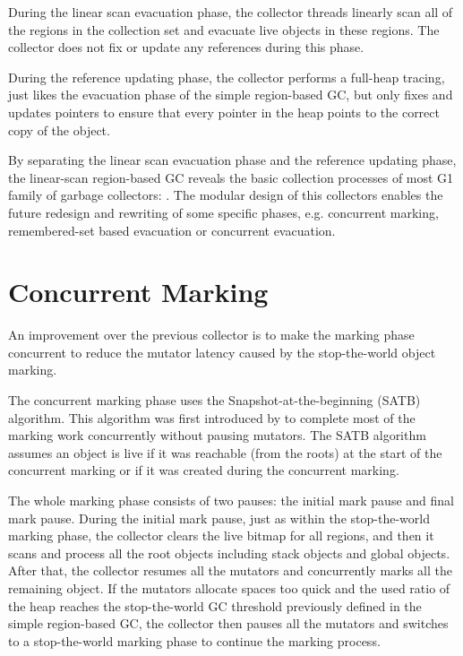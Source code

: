 During the linear scan evacuation phase, the collector threads linearly scan all of the regions
in the collection set and evacuate live objects in these regions. The collector does not
fix or update any references during this phase.

During the reference updating phase, the collector performs a full-heap tracing,
just likes the evacuation phase of the simple region-based GC, but only fixes and updates
pointers to ensure that every pointer in the heap points to the correct copy of the object.

By separating the linear scan evacuation phase and the reference updating phase,
the linear-scan region-based GC reveals the basic collection processes of most G1 family
of garbage collectors: .
The modular design of this collectors enables the future redesign and rewriting of some specific
phases, e.g. concurrent marking, remembered-set based evacuation or concurrent evacuation.

\section{Concurrent Marking}
\label{sec:concmarkgc}

An improvement over the previous collector is to make the marking phase concurrent to reduce the
mutator latency caused by the stop-the-world object marking.

The concurrent marking phase uses the Snapshot-at-the-beginning (SATB) algorithm.
This algorithm was first introduced by \cite{yuasa1990real} to
complete most of the marking work concurrently without pausing mutators.
The SATB algorithm assumes an object is live if it was reachable (from the roots)
at the start of the concurrent marking or if it was created during the concurrent marking.

The whole marking phase consists of two pauses: the initial mark pause and final mark pause.
During the initial mark pause, just as within the stop-the-world marking phase,
the collector clears the live bitmap for all regions,
and then it scans and process all the root objects including stack objects and global objects.
After that, the collector resumes all the mutators and concurrently marks all the remaining object.
If the mutators allocate spaces too quick and the used ratio of the heap reaches
the stop-the-world GC threshold previously defined in the simple region-based GC, the
collector then pauses all the mutators and switches to a stop-the-world marking phase
to continue the marking process.

